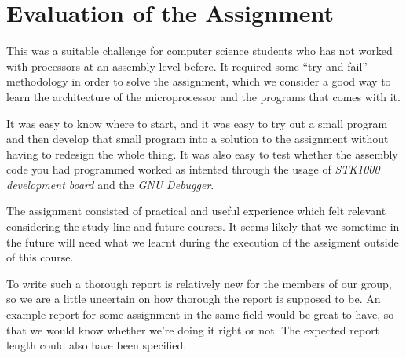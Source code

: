 \section{Evaluation of the Assignment}

This was a suitable challenge for computer science students who has not
worked with processors at an assembly level before. It required some
``try-and-fail''-methodology in order to solve the assignment, which we
consider a good way to learn the architecture of the microprocessor
and the programs that comes with it.

It was easy to know where to start, and it was easy to try out a small
program and then develop that small program into a solution to the
assignment without having to redesign the whole thing. It was also easy
to test whether the assembly code you had programmed worked as intented
through the usage of {\em STK1000 development board} and the {\em GNU Debugger}.

The assignment consisted of practical and useful experience which felt
relevant considering the study line and future courses. It seems likely
that we sometime in the future will need what we learnt during the
execution of the assigment outside of this course.

To write such a thorough report is relatively new for the members of our
group, so we are a little uncertain on how thorough the report is
supposed to be. An example report for some assignment in the same field
would be great to have, so that we would know whether we're doing it
right or not. The expected report length could also have been specified.

